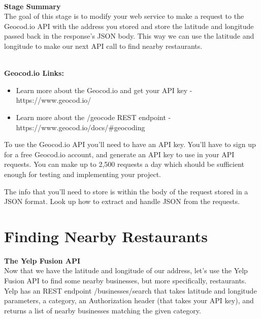 \documentclass{article}
\begin{document}
\-\ \\
\textbf{Stage Summary}\\
The goal of this stage is to modify your web service to make a request to the Geocod.io API with the address you stored and store the latitude and longitude passed back in the response's JSON body. This way we can use the latitude and longitude to make our next API call to find nearby restaurants. 

\-\ \\
\textbf{Geocod.io Links:}
\begin{itemize}
\item  Learn more about the Geocod.io and get your API key - https://www.geocod.io/
\item Learn more about the /geocode REST endpoint - https://www.geocod.io/docs/\#geocoding
\end{itemize}

\begin{info}
To use the Geocod.io API you'll need to have an API key. You'll have to sign up for a free Geocod.io account, and generate an API key to use in your API requests. You can make up to 2,500 requests a day which should be sufficient enough for testing and implementing your project. 
\end{info}

\begin{info}
The info that you'll need to store is within the body of the request stored in a JSON format. Look up how to extract and handle JSON from the requests.
\end{info}




\section{Finding Nearby Restaurants}
\textbf{The Yelp Fusion API}\\
Now that we have the latitude and longitude of our address, let's use the Yelp Fusion API to find some nearby businesses, but more specifically, restaurants. Yelp has an REST endpoint /businesses/search that takes latitude and longitude parameters, a category, an Authorization header (that takes your API key), and returns a list of nearby businesses matching the given category.
\end{document}
